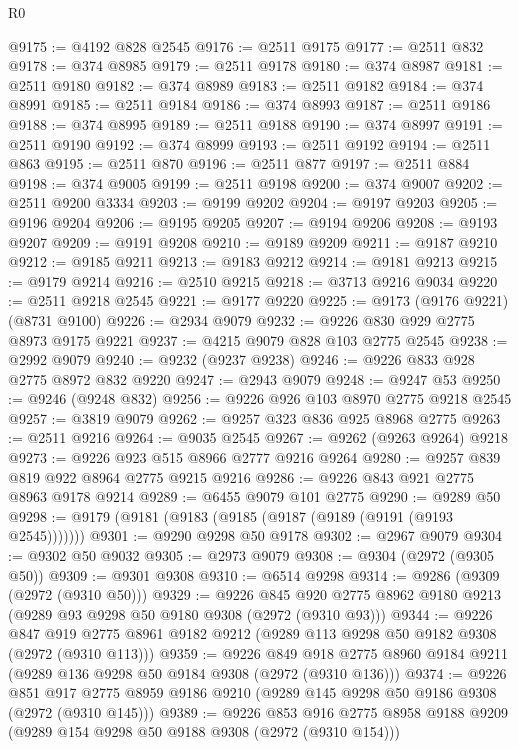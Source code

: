 \begin{lexlean}{R0}
\begin{coremodule}
@9175 := @4192 @828 @2545
@9176 := @2511 @9175
@9177 := @2511 @832
@9178 := @374 @8985
@9179 := @2511 @9178
@9180 := @374 @8987
@9181 := @2511 @9180
@9182 := @374 @8989
@9183 := @2511 @9182
@9184 := @374 @8991
@9185 := @2511 @9184
@9186 := @374 @8993
@9187 := @2511 @9186
@9188 := @374 @8995
@9189 := @2511 @9188
@9190 := @374 @8997
@9191 := @2511 @9190
@9192 := @374 @8999
@9193 := @2511 @9192
@9194 := @2511 @863
@9195 := @2511 @870
@9196 := @2511 @877
@9197 := @2511 @884
@9198 := @374 @9005
@9199 := @2511 @9198
@9200 := @374 @9007
@9202 := @2511 @9200 @3334
@9203 := @9199 @9202
@9204 := @9197 @9203
@9205 := @9196 @9204
@9206 := @9195 @9205
@9207 := @9194 @9206
@9208 := @9193 @9207
@9209 := @9191 @9208
@9210 := @9189 @9209
@9211 := @9187 @9210
@9212 := @9185 @9211
@9213 := @9183 @9212
@9214 := @9181 @9213
@9215 := @9179 @9214
@9216 := @2510 @9215
@9218 := @3713 @9216 @9034
@9220 := @2511 @9218 @2545
@9221 := @9177 @9220
@9225 := @9173 (@9176 @9221) (@8731 @9100)
@9226 := @2934 @9079
@9232 := @9226 @830 @929 @2775 @8973 @9175 @9221
@9237 := @4215 @9079 @828 @103 @2775 @2545
@9238 := @2992 @9079
@9240 := @9232 (@9237 @9238)
@9246 := @9226 @833 @928 @2775 @8972 @832 @9220
@9247 := @2943 @9079
@9248 := @9247 @53
@9250 := @9246 (@9248 @832)
@9256 := @9226 @926 @103 @8970 @2775 @9218 @2545
@9257 := @3819 @9079
@9262 := @9257 @323 @836 @925 @8968 @2775
@9263 := @2511 @9216
@9264 := @9035 @2545
@9267 := @9262 (@9263 @9264) @9218
@9273 := @9226 @923 @515 @8966 @2777 @9216 @9264
@9280 := @9257 @839 @819 @922 @8964 @2775 @9215 @9216
@9286 := @9226 @843 @921 @2775 @8963 @9178 @9214
@9289 := @6455 @9079 @101 @2775
@9290 := @9289 @50
@9298 := @9179 (@9181 (@9183 (@9185 (@9187 (@9189 (@9191 (@9193 @2545)))))))
@9301 := @9290 @9298 @50 @9178
@9302 := @2967 @9079
@9304 := @9302 @50 @9032
@9305 := @2973 @9079
@9308 := @9304 (@2972 (@9305 @50))
@9309 := @9301 @9308
@9310 := @6514 @9298
@9314 := @9286 (@9309 (@2972 (@9310 @50)))
@9329 := @9226
    @845
    @920
    @2775
    @8962
    @9180
    @9213
    (@9289 @93 @9298 @50 @9180 @9308 (@2972 (@9310 @93)))
@9344 := @9226
    @847
    @919
    @2775
    @8961
    @9182
    @9212
    (@9289 @113 @9298 @50 @9182 @9308 (@2972 (@9310 @113)))
@9359 := @9226
    @849
    @918
    @2775
    @8960
    @9184
    @9211
    (@9289 @136 @9298 @50 @9184 @9308 (@2972 (@9310 @136)))
@9374 := @9226
    @851
    @917
    @2775
    @8959
    @9186
    @9210
    (@9289 @145 @9298 @50 @9186 @9308 (@2972 (@9310 @145)))
@9389 := @9226
    @853
    @916
    @2775
    @8958
    @9188
    @9209
    (@9289 @154 @9298 @50 @9188 @9308 (@2972 (@9310 @154)))

\end{coremodule}
\end{lexlean}
